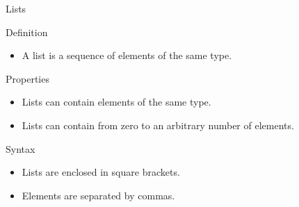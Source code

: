 \begin{frame}{Lists}
    \begin{block}{Definition}
        \begin{itemize}
            \item A list is a sequence of elements of the same type.
        \end{itemize}
    \end{block}
    \begin{block}{Properties}
        \begin{itemize}
            \item Lists can contain elements of the same type.
            \item Lists can contain from zero to an arbitrary number of elements.
        \end{itemize}
    \end{block}
    \begin{block}{Syntax}
        \begin{itemize}
            \item Lists are enclosed in square brackets.
            \item Elements are separated by commas.
        \end{itemize}
    \end{block}
\end{frame}